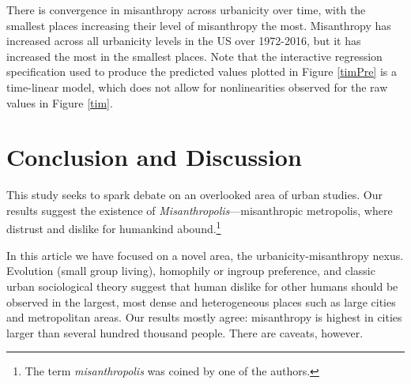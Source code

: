 \documentclass[11pt, letterpaper]{article}
\begin{document}
\begin{spacing}{1.4}
There is convergence in misanthropy across urbanicity over time, with the
smallest places increasing their level of misanthropy the most. Misanthropy has
increased across all urbanicity levels in the US over 1972-2016, but it has
increased the most in the smallest places. %
 Note that the interactive regression
specification used to produce the predicted values plotted in Figure
\ref{timPre} is a time-linear model, which does not allow for nonlinearities observed for the raw values in Figure \ref{tim}.

%


\section*{Conclusion and Discussion}

This study seeks to spark debate on an overlooked area of urban studies. 
 Our results suggest the existence of
\emph{Misanthropolis}---misanthropic metropolis,  where distrust and dislike for humankind
abound.\footnote{The term \emph{misanthropolis} was coined by one of the authors.}


In this article we have focused on a  novel area, the urbanicity-misanthropy
nexus. %
Evolution  (small group living),  homophily or ingroup preference, and classic
urban sociological theory suggest that human dislike for other humans should be
observed in the largest, most dense and heterogeneous places such as large
cities and metropolitan areas. Our results mostly agree: misanthropy is highest in cities larger than several hundred thousand people. There are caveats, however. 


\end{spacing}
\end{document}
